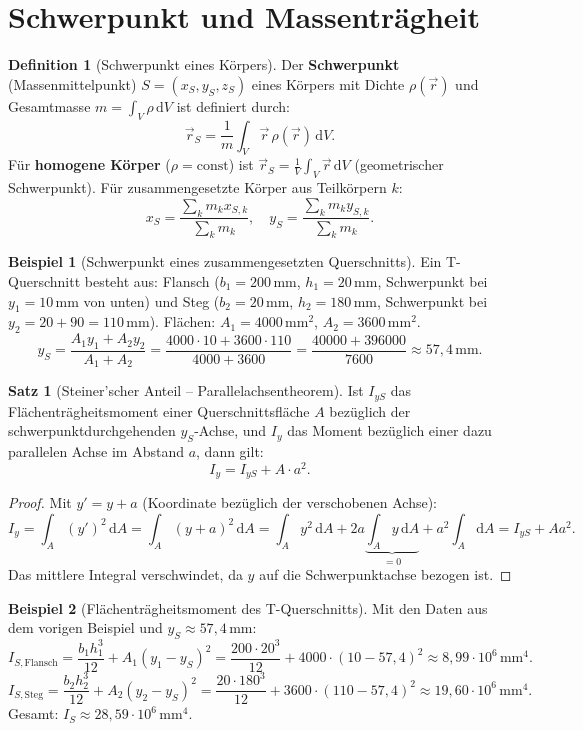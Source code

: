 ﻿\documentclass[a4paper,12pt]{report}
\theoremstyle{definition}
\newtheorem{definition}{Definition}
\newtheorem{beispiel}{Beispiel}
\newtheorem{satz}{Satz}
\begin{document}
\section{Schwerpunkt und Massentr\"agheit}

\begin{definition}[Schwerpunkt eines K\"orpers]
Der \textbf{Schwerpunkt} (Massenmittelpunkt) $S = (x_S, y_S, z_S)$
eines K\"orpers mit Dichte $\rho(\vec{r})$ und Gesamtmasse
$m = \int_V \rho\,\mathrm{d}V$ ist definiert durch:
\[
  \vec{r}_S = \frac{1}{m}\int_V \vec{r}\,\rho(\vec{r})\,\mathrm{d}V.
\]
F\"ur \textbf{homogene K\"orper} ($\rho = \mathrm{const}$) ist
$\vec{r}_S = \frac{1}{V}\int_V \vec{r}\,\mathrm{d}V$ (geometrischer Schwerpunkt).
F\"ur zusammengesetzte K\"orper aus Teilk\"orpern $k$:
\[
  x_S = \frac{\sum_k m_k x_{S,k}}{\sum_k m_k}, \quad
  y_S = \frac{\sum_k m_k y_{S,k}}{\sum_k m_k}.
\]
\end{definition}

\begin{beispiel}[Schwerpunkt eines zusammengesetzten Querschnitts]
Ein T-Querschnitt besteht aus:
Flansch ($b_1 = 200\,\mathrm{mm}$, $h_1 = 20\,\mathrm{mm}$,
Schwerpunkt bei $y_1 = 10\,\mathrm{mm}$ von unten)
und Steg ($b_2 = 20\,\mathrm{mm}$, $h_2 = 180\,\mathrm{mm}$,
Schwerpunkt bei $y_2 = 20 + 90 = 110\,\mathrm{mm}$).
Fl\"achen: $A_1 = 4000\,\mathrm{mm^2}$, $A_2 = 3600\,\mathrm{mm^2}$.
\[
  y_S = \frac{A_1 y_1 + A_2 y_2}{A_1 + A_2}
      = \frac{4000\cdot 10 + 3600\cdot 110}{4000 + 3600}
      = \frac{40000 + 396000}{7600} \approx 57{,}4\,\mathrm{mm}.
\]
\end{beispiel}

\begin{satz}[Steiner'scher Anteil -- Parallelachsentheorem]
Ist $I_{yS}$ das Fl\"achentr\"agheitsmoment einer Querschnittsfl\"ache $A$
bez\"uglich der schwerpunktdurchgehenden $y_S$-Achse, und $I_y$ das Moment
bez\"uglich einer dazu parallelen Achse im Abstand $a$, dann gilt:
\[
  I_y = I_{yS} + A \cdot a^2.
\]
\end{satz}
\begin{proof}
Mit $y' = y + a$ (Koordinate bez\"uglich der verschobenen Achse):
\[
  I_y = \int_A (y')^2\,\mathrm{d}A = \int_A(y+a)^2\,\mathrm{d}A
  = \int_A y^2\,\mathrm{d}A + 2a\underbrace{\int_A y\,\mathrm{d}A}_{=0} + a^2\int_A\mathrm{d}A
  = I_{yS} + Aa^2.
\]
Das mittlere Integral verschwindet, da $y$ auf die Schwerpunktachse bezogen ist.
\end{proof}

\begin{beispiel}[Fl\"achentr\"agheitsmoment des T-Querschnitts]
Mit den Daten aus dem vorigen Beispiel und $y_S \approx 57{,}4\,\mathrm{mm}$:
\[
  I_{S,\text{Flansch}} = \frac{b_1 h_1^3}{12} + A_1(y_1 - y_S)^2
  = \frac{200\cdot20^3}{12} + 4000\cdot(10-57{,}4)^2 \approx 8{,}99\cdot10^6\,\mathrm{mm^4}.
\]
\[
  I_{S,\text{Steg}} = \frac{b_2 h_2^3}{12} + A_2(y_2 - y_S)^2
  = \frac{20\cdot180^3}{12} + 3600\cdot(110-57{,}4)^2 \approx 19{,}60\cdot10^6\,\mathrm{mm^4}.
\]
Gesamt: $I_S \approx 28{,}59\cdot10^6\,\mathrm{mm^4}$.
\end{beispiel}
\end{document}
